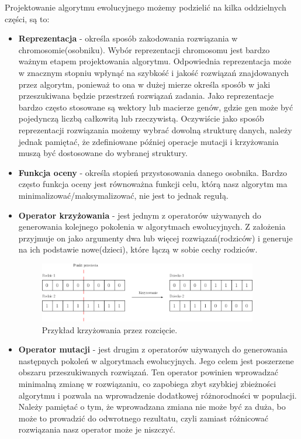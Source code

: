 Projektowanie algorytmu ewolucyjnego możemy podzielić na kilka oddzielnych części, są to: 
\begin{itemize}
    \item \textbf{Reprezentacja} - określa sposób zakodowania rozwiązania w chromosomie(osobniku). Wybór reprezentacji chromosomu jest bardzo ważnym etapem 
    projektowania algorytmu. Odpowiednia reprezentacja może w znacznym stopniu wpłynąć na szybkość i jakość rozwiązań znajdowanych przez 
    algorytm, ponieważ to ona w dużej mierze określa sposób w jaki przeszukiwana będzie przestrzeń rozwiązań zadania. 
    Jako reprezentacje bardzo często stosowane są wektory lub macierze genów, gdzie gen może być pojedynczą liczbą całkowitą lub rzeczywistą. 
    Oczywiście jako sposób reprezentacji rozwiązania możemy wybrać dowolną strukturę danych, należy jednak pamiętać, że zdefiniowane później 
    operacje mutacji i krzyżowania muszą być dostosowane do wybranej struktury.
    
    \item \textbf{Funkcja oceny} - określa stopień przystosowania danego osobnika. Bardzo często funkcja oceny jest równoważna funkcji celu, którą 
    nasz algorytm ma minimalizować/maksymalizować, nie jest to jednak regułą. 

    \item \textbf{Operator krzyżowania} - jest jednym z operatorów używanych do generowania kolejnego pokolenia w algorytmach ewolucyjnych. Z założenia 
    przyjmuje on jako argumenty dwa lub więcej rozwiązań(rodziców) i generuje na ich podstawie nowe(dzieci), które łączą w sobie cechy rodziców. 
    
    \begin{figure}[H]
        \centering        
        \includegraphics[width=0.9\textwidth]{img/cross_example.png}
        \caption{Przykład krzyżowania przez rozcięcie.}
    \end{figure}

    \item \textbf{Operator mutacji} - jest drugim z operatorów używanych do generowania następnych pokoleń w algorytmach ewolucyjnych. Jego celem jest 
    poszerzene obszaru przeszukiwanych rozwiązań. Ten operator powinien wprowadzać minimalną zmianę w rozwiązaniu, co zapobiega zbyt szybkiej 
    zbieżności algorytmu i pozwala na wprowadzenie dodatkowej różnorodności w populacji. Należy pamiętać o tym, że wprowadzana zmiana nie może 
    być za duża, bo może to prowadzić do odwrotnego rezultatu, czyli zamiast różnicować rozwiązania nasz operator może je niszczyć.
    

\end{itemize}
